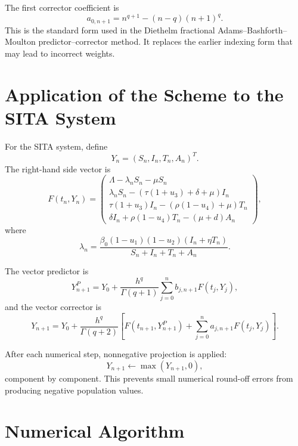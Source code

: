\documentclass[12pt,a4paper,oneside]{report}
\begin{document}
\begin{resultbox}[title={Corrected ABM weight formula}]
The first corrector coefficient is
\[
a_{0,n+1}=n^{q+1}-(n-q)(n+1)^q.
\]
This is the standard form used in the Diethelm fractional Adams--Bashforth--Moulton predictor--corrector method. It replaces the earlier indexing form that may lead to incorrect weights.
\end{resultbox}

\section{Application of the Scheme to the SITA System}

For the SITA system, define
\[
Y_n=(S_n,I_n,T_n,A_n)^T.
\]
The right-hand side vector is
\[
F(t_n,Y_n)=
\begin{pmatrix}
\Lambda-\lambda_nS_n-\mu S_n\\
\lambda_nS_n-(\tau(1+u_3)+\delta+\mu)I_n\\
\tau(1+u_3)I_n-(\rho(1-u_4)+\mu)T_n\\
\delta I_n+\rho(1-u_4)T_n-(\mu+d)A_n
\end{pmatrix},
\]
where
\[
\lambda_n=
\frac{\beta_0(1-u_1)(1-u_2)(I_n+\eta T_n)}
{S_n+I_n+T_n+A_n}.
\]

The vector predictor is
\begin{equation}
Y_{n+1}^{P}
=
Y_0+\frac{h^q}{\Gamma(q+1)}
\sum_{j=0}^{n}b_{j,n+1}F(t_j,Y_j),
\label{eq:vector_predictor}
\end{equation}
and the vector corrector is
\begin{equation}
Y_{n+1}
=
Y_0+\frac{h^q}{\Gamma(q+2)}
\left[
F(t_{n+1},Y_{n+1}^{P})
+
\sum_{j=0}^{n}a_{j,n+1}F(t_j,Y_j)
\right].
\label{eq:vector_corrector}
\end{equation}

After each numerical step, nonnegative projection is applied:
\[
Y_{n+1}\leftarrow \max(Y_{n+1},0),
\]
component by component. This prevents small numerical round-off errors from producing negative population values.

\section{Numerical Algorithm}
\end{document}
